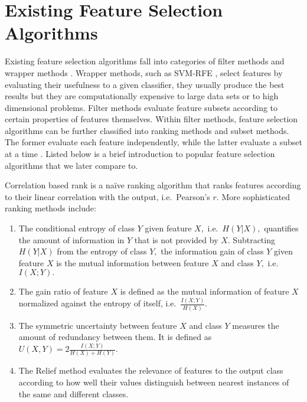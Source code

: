 \section{Existing Feature Selection Algorithms}

Existing feature selection algorithms fall into categories of filter
methods and wrapper methods \cite{guyon_jmlr03}. Wrapper methods, such as SVM-RFE \cite{guyon2002gene}, select features by evaluating their usefulness to a given classifier, they usually produce the best results but they are computationally expensive to large data sets or to high dimensional problems. Filter methods
evaluate feature subsets according to certain properties of features 
themselves. Within filter methods, feature selection algorithms can be
further classified into ranking methods and subset methods. The former
evaluate each feature independently, while the latter evaluate a
subset at a time \cite{brown2012conditional}. Listed below is a brief
introduction to popular feature selection algorithms that we later
compare to.

Correlation based rank is a na\"{i}ve ranking algorithm that ranks
features according to their linear correlation with the output,
i.e.\ Pearson's $r.$ More sophisticated ranking methods include:
\begin{enumerate}
\item The conditional entropy of class $Y$ given feature $X,$
  i.e.\ $H\left(Y|X\right),$ quantifies the amount of information in
  $Y$ that is not provided by $X.$ Subtracting $H\left(Y|X\right)$
  from the entropy of class $Y,$ the information gain of class $Y$
  given feature $X$ is the mutual information between feature $X$ and
  class $Y,$ i.e.\ $I\left(X;Y\right).$
\item The gain ratio of feature $X$ is defined as the mutual information
  of feature $X$ normalized against the entropy of itself,
  i.e.\ $\frac{I\left(X;Y\right)}{H\left(X\right)}.$
\item The symmetric uncertainty between feature $X$ and class $Y$
  measures the amount of redundancy between them. It is defined as
  $U\left(X,Y\right)=2\frac{I\left(X;Y\right)}{H\left(X\right)+H\left(Y\right)}.$
\item The Relief method \cite{kira1992feature} evaluates the relevance
  of features to the output class according to how well their values
  distinguish between nearest instances of the same and different
  classes.
\end{enumerate}

